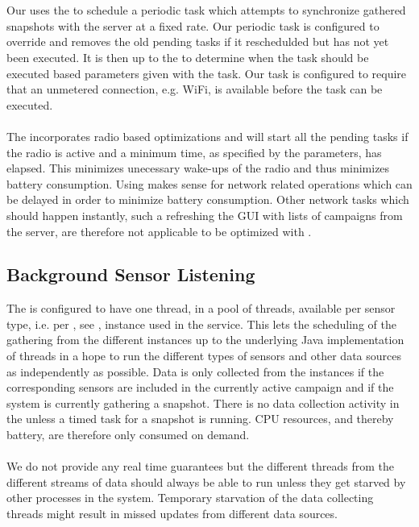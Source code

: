 \\\\
Our  uses the  to schedule a periodic task which attempts to synchronize gathered snapshots with the server at a fixed rate. Our periodic task is configured to override and removes the old pending tasks if it reschedulded but has not yet been executed. It is then up to the  to determine when the task should be executed based parameters given with the task. Our task is configured to require that an unmetered connection, e.g. WiFi, is available before the task can be executed. 
\\\\
The  incorporates radio based optimizations and will start all the pending tasks if the radio is active and a minimum time, as specified by the parameters, has elapsed. This minimizes unecessary wake-ups of the radio and thus minimizes battery consumption. Using  makes sense for network related operations which can be delayed in order to minimize battery consumption. Other network tasks which should happen instantly, such a refreshing the GUI with lists of campaigns from the server, are therefore not applicable to be optimized with . 

\subsection{Background Sensor Listening}
The  is configured to have one thread, in a pool of threads, available per sensor type, i.e. per , see , instance used in the service. This lets the scheduling of the gathering from the different  instances up to the underlying Java implementation of threads in a hope to run the different types of sensors and other data sources as independently as possible. Data is only collected from the  instances if the corresponding sensors are included in the currently active campaign and if the system is currently gathering a snapshot. There is no data collection activity in the  unless a timed task for a snapshot is running. CPU resources, and thereby battery, are therefore only consumed on demand.
\\\\
We do not provide any real time guarantees but the different threads from the different streams of data should always be able to run unless they get starved by other processes in the system. Temporary starvation of the data collecting threads might result in missed updates from different data sources. 

